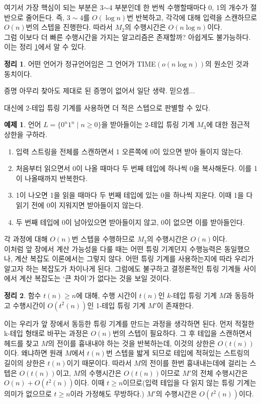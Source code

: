 \documentclass[b5paper]{book}
\theoremstyle{definition}
\newtheorem{thm}{정리}[chapter]
\newtheorem{ex}{예제}[chapter]
\newenvironment{pf*}{\pushQED{\qed}\pf}{\popQED\endpf}
\begin{document}
여기서 가장 핵심이 되는 부분은 3$\sim$4 부분인데 한 번씩 수행할때마다 0, 1의 개수가 절반으로 줄어든다.
즉, $3\sim 4$를 $O(\log{n})$번 반복하고, 각각에 대해 입력을 스캔하므로 $O(n)$번의 스텝을 진행한다. 
따라서 $M_2$의 수행시간은 $O(n\log{n})$이다. \\ 
그럼 이보다 더 빠른 수행시간을 가지는 알고리즘은 존재할까? 아쉽게도 불가능하다. 이는 정리
\ref{regular_nlogn}에서 알 수 있다.
\begin{thm} \label{regular_nlogn}
    어떤 언어가 정규언어임은 그 언어가 TIME$(o(n\log{n}))$의 원소인 것과 동치이다. 
\end{thm}
\begin{pf*}
    증명 아무리 찾아도 제대로 된 증명이 없어서 일단 생략. 믿으셈...
\end{pf*}
대신에 2-테입 튜링 기계를 사용하면 더 적은 스텝으로 판별할 수 있다. 
\begin{ex}
    언어 $L= \{0^n1^n \;\vert\; n \ge 0\}$을 받아들이는 2-테입 튜링 기계 $M_3$에
     대한 점근적 상한을 구하라.
    \begin{enumerate}
        \item 입력 스트링을 전체를 스캔하면서 1 오른쪽에 0이 있으면 받아 들이지 않는다. 
        \item 처음부터 읽으면서 0이 나올 때마다 두 번째 테입에 하나씩 0을 복사해둔다.
        이를 1이 나올때까지 반복한다. 
        \item 1이 나오면 1을 읽을 때마다 두 번째 테입에 있는 0을 하나씩 지운다.
        이때 1을 다 읽기 전에 0이 지워지면 받아들이지 않는다.
        \item 두 번째 테입에 0이 남아있으면 받아들이지 않고, 0이 없으면 이를 받아들인다. 
    \end{enumerate}
\end{ex}
각 과정에 대해 $O(n)$번 스텝을 수행하므로 $M_3$의 수행시간은 $O(n)$이다. \\ 
이처럼 앞 장에서 계산 가능성을 다룰 때는 어떤 튜링 기계던지 수행능력은 동일했으나, 계산
복잡도 이론에서는 그렇지 않다. 어떤 튜링 기계를 사용하는지에 따라 우리가 알고자 하는 복잡도가
차이나게 된다. 그럼에도 불구하고 결정론적인 튜링 기계들 사이에서 계산 복잡도는 `큰 차이'가
없다는 것을 보일 것이다. 
\begin{thm} \label{t^2(n)}
    함수 $t(n) \ge n$에 대해, 수행 시간이 $t(n)$인 $k$-테입 튜링 기계 $M$과 동등하고
    수행시간이 $O\left(t^2(n)\right)$인 1-테입 튜링 기계 $M'$이 존재한다. 
\end{thm}
\begin{pf*}
    이는 우리가 앞 장에서 동등한 튜링 기계를 만드는 과정을 
    생각하면 된다. 먼저 적절한 k-테입 형태로 바꾸는 과정은 $O(n)$번의 스텝이 필요하다. 
    그 후 테입을 스캔하면서 헤드를 찾고 $M$의 전이를 흉내내야 하는 것을 반복하는데, 
    이것의 상한은 $O(t(n))$이다.
    왜냐하면 원래 $M$에서 $t(n)$번 스텝을 밟게 되므로 테입에 
    적혀있는 스트링의 길이의 상한은 $t(n)$이기 때문이다. 따라서 $M$의 전이를 한번 흉내내는데에
     걸리는 스텝은 $O(t(n))$이고,
    $M$의 수행시간은 $O(t(n))$이므로 $M'$의 전체 수행시간은 $O(n) + O(t^2(n))$이다. 
    이때 $t \ge n$이므로(입력 테입을
    다 읽지 않는 튜링 기계는 의미가 없으므로 $t\ge n$이라 가정해도 무방하다.) $M'$의 
    수행시간은 $O(t^2(n))$이다.
\end{pf*}
\end{document}
